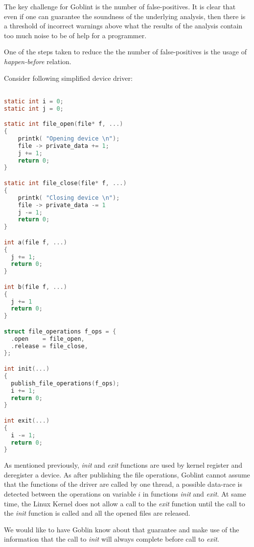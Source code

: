 \documentclass[..thesis.tex]{subfiles}
\begin{document}

The key challenge for Goblint is the number of false-positives. It is clear that even if one can guarantee the soundness of the 
underlying analysis, then there is a threshold of incorrect warnings above what the results of the analysis contain too much noise
to be of help for a programmer.


One of the steps taken to reduce the the number of false-positives is the usage of \textit{happen-before} relation.


Consider following simplified device driver:

\begin{lstlisting}[language=c,style=def]

static int i = 0;
static int j = 0;

static int file_open(file* f, ...)
{
    printk( "Opening device \n");
    file -> private_data += 1;
    j += 1;
    return 0;
}

static int file_close(file* f, ...)
{
    printk( "Closing device \n");
    file -> private_data -= 1
    j -= 1;
    return 0;
}

int a(file f, ...)
{
  j += 1;
  return 0;
}

int b(file f, ...)
{
  j += 1
  return 0;
}

struct file_operations f_ops = {
  .open    = file_open,
  .release = file_close,
};

int init(...)
{
  publish_file_operations(f_ops);
  i += 1;
  return 0;
}

int exit(...)
{
  i -= 1;
  return 0;
}

\end{lstlisting}

As mentioned previously, \textit{init} and \textit{exit} functions are used by kernel register and deregister a device. As after publishing the file operations, Goblint cannot assume that the functions of the driver are called by one thread, a possible data-race is detected between the operations on variable $i$ in functions \textit{init} and \textit{exit}. At same time, the Linux Kernel does not allow a call to the \textit{exit} function until the call to the \textit{init} function is called and all the opened files are released.

We would like to have Goblin know about that guarantee and make use of the information that the call to \textit{init} will always complete before call to \textit{exit}.
\end{document}
